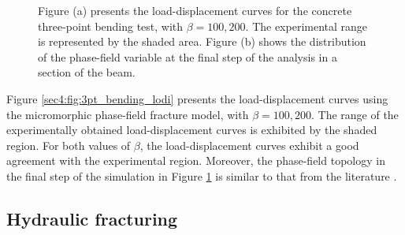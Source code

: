 \documentclass[11pt]{article}
\begin{document}
\begin{figure}[!ht]
\begin{subfigure}[t]{0.45\textwidth}
  \centering
    \caption{ }
    \label{sec4:fig:pf_3pt_bending_failure}
  \end{subfigure}
  \caption{Figure (a) presents the load-displacement curves for the concrete three-point bending test, with $\beta = 100, 200$. The experimental range is represented by the shaded area. Figure (b) shows the distribution of the phase-field variable at the final step of the analysis in a section of the beam.}
  \label{sec4:fig:3pt_bending_results}
\end{figure}

Figure \ref{sec4:fig:3pt_bending_lodi} presents the load-displacement curves using the micromorphic phase-field fracture model, with $\beta = 100,200$. The range of the experimentally obtained load-displacement curves is exhibited by the shaded region. For both values of $\beta$, the load-displacement curves exhibit a good agreement with the experimental region. Moreover, the phase-field topology in the final step of the simulation in Figure \ref{sec4:fig:pf_3pt_bending_failure} is similar to that from the literature \cite{Rots1988}.

\subsection{Hydraulic fracturing}\label{sec4:HydFrac}
\end{document}
